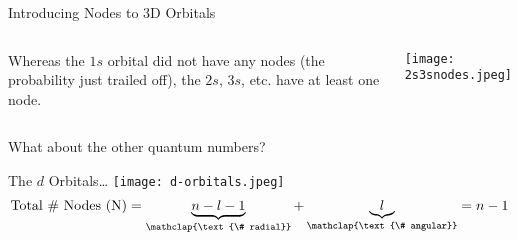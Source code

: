 \documentclass[notes=onlyslideswithnotes,notes=hide]{beamer}
\begin{document}
\begin{frame}{Introducing Nodes to 3D Orbitals}
	\begin{columns}
		Whereas the $1s$ orbital did not have any nodes (the probability
		just trailed off), the $2s$, $3s$, etc. have \alert{at least} one
		node.


		\centering
		\texttt{[image: 2s3snodes.jpeg]}
	\end{columns}
\end{frame}

\begin{frame}{What about the other quantum numbers?}
	\begin{center}
	\end{center}
\end{frame}

\begin{frame}{The $d$ Orbitals\ldots}
	\centering
	\texttt{[image: d-orbitals.jpeg]}
	\begin{equation*}
		\text{Total \# Nodes (N)} = \underbrace{n - l -
		1}_{\mathclap{\text{\# radial}}} +
		\underbrace{l}_{\mathclap{\text{\# angular}}} = n - 1
	\end{equation*}
\end{frame}
\end{document}

